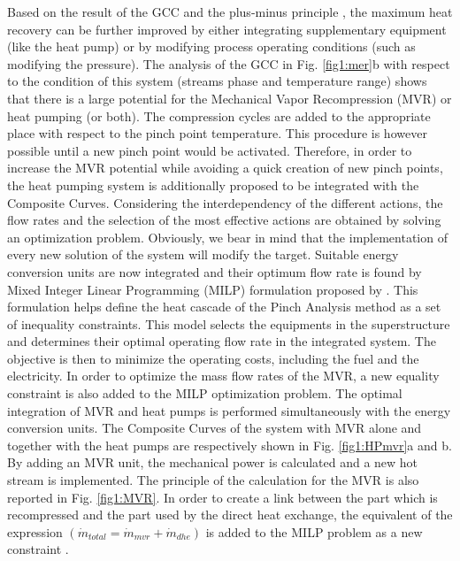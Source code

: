         

Based on the result of the GCC and the plus-minus principle \cite{Linnhoff1993503}, the maximum heat recovery can be further improved by either integrating supplementary equipment (like the heat pump) or by modifying process operating conditions (such as modifying the pressure). The analysis of the GCC in Fig. \ref{fig1:mer}b with respect to the condition of this system (streams phase and temperature range) shows that there is a large potential for the Mechanical Vapor Recompression (MVR) or heat pumping (or both). The compression cycles are added to the appropriate place with respect to the pinch point temperature. This procedure is however possible until a new pinch point would be activated. Therefore, in order to increase the MVR potential while avoiding a quick creation of new pinch points, the heat pumping system is additionally proposed to be integrated with the Composite Curves. Considering the interdependency of the different actions, the flow rates and the selection of the most effective actions are obtained by solving an optimization problem. Obviously, we bear in mind that the implementation of every new solution of the system will modify the target. Suitable energy conversion units are now integrated and their optimum flow rate is found by Mixed Integer Linear Programming (MILP) formulation proposed by \citet{marechal1998process}. This formulation helps define the heat cascade of the Pinch Analysis method as a set of inequality constraints. This model selects the equipments in the superstructure and determines their optimal operating flow rate in the integrated system. The objective is then to minimize the operating costs, including the fuel and the electricity. In order to optimize the mass flow rates of the MVR, a new equality constraint is also added to the MILP optimization problem. The optimal integration of MVR and heat pumps is performed simultaneously with the energy conversion units. The Composite Curves of the system with MVR alone and together with the heat pumps are respectively shown in Fig. \ref{fig1:HPmvr}a and b. By adding an MVR unit, the mechanical power is calculated and a new hot stream is implemented. The principle of the calculation for the MVR is also reported in Fig. \ref{fig1:MVR}. In order to create a link between the part which is recompressed and the part used by the direct heat exchange, the equivalent of the expression $\left( \dot{m}_{total}=\dot{m}_{mvr}+\dot{m}_{dhe}\right) $ is added to the MILP problem as a new constraint \cite{EPFL-ARTICLE-163637}.


